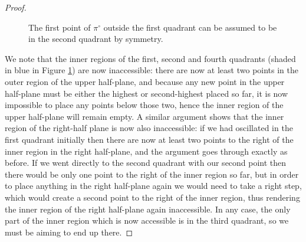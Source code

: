 \documentclass[11pt,a4paper]{article}
\theoremstyle{definition}
\begin{document}
\begin{proof}
\begin{figure}[h]
\begin{center}
\end{center}
\caption{The first point of $\pi^{\circ}$ outside the first quadrant can be assumed to be in the second quadrant by symmetry.}
\label{fig:boxdec3}
\end{figure}

We note that the inner regions of the first, second and fourth quadrants (shaded in blue in Figure \ref{fig:boxdec3}) are now inaccessible: there are now at least two points in the outer region of the upper half-plane, and because any new point in the upper half-plane must be either the highest or second-highest placed so far, it is now impossible to place any points below those two, hence the inner region of the upper half-plane will remain empty. A similar argument shows that the inner region of the right-half plane is now also inaccessible: if we had oscillated in the first quadrant initially then there are now at least two points to the right of the inner region in the right half-plane, and the argument goes through exactly as before. If we went directly to the second quadrant with our second point then there would be only one point to the right of the inner region so far, but in order to place anything in the right half-plane again we would need to take a right step, which would create a second point to the right of the inner region, thus rendering the inner region of the right half-plane again inaccessible. In any case, the only part of the inner region which is now accessible is in the third quadrant, so we must be aiming to end up there.


\end{proof}
\end{document}
